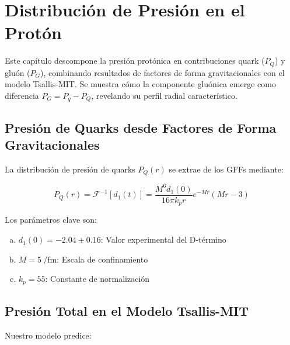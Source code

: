 \chapter{Distribución de Presión en el Protón}\label{ch: TotalPandGluons}

\fancyhf{} %

\begin{chaptersummary}
    Este capítulo descompone la presión protónica en contribuciones quark ($P_Q$) y gluón ($P_G$), combinando resultados de factores de forma gravitacionales \cite{Burkert_2018} con el modelo Tsallis-MIT. Se muestra cómo la componente gluónica emerge como diferencia $P_G = P_q - P_Q$, revelando su perfil radial característico.
\end{chaptersummary}

\section{Presión de Quarks desde Factores de Forma Gravitacionales}
La distribución de presión de quarks $P_Q(r)$ se extrae de los GFFs mediante:

\begin{equation}
P_Q(r) = \mathcal{F}^{-1}[d_1(t)] = \frac{M^6 d_1(0)}{16\pi k_p r} e^{-Mr}(Mr - 3)
\end{equation}

Los parámetros clave son:
\begin{enumerate}[(a)]
    \item $d_1(0) = -2.04 \pm 0.16$: Valor experimental del D-término
    \item $M = \qty{5}{\per\femto\meter}$: Escala de confinamiento
    \item $k_p = 55$: Constante de normalización
\end{enumerate}

\section{Presión Total en el Modelo Tsallis-MIT}
Nuestro modelo predice:

